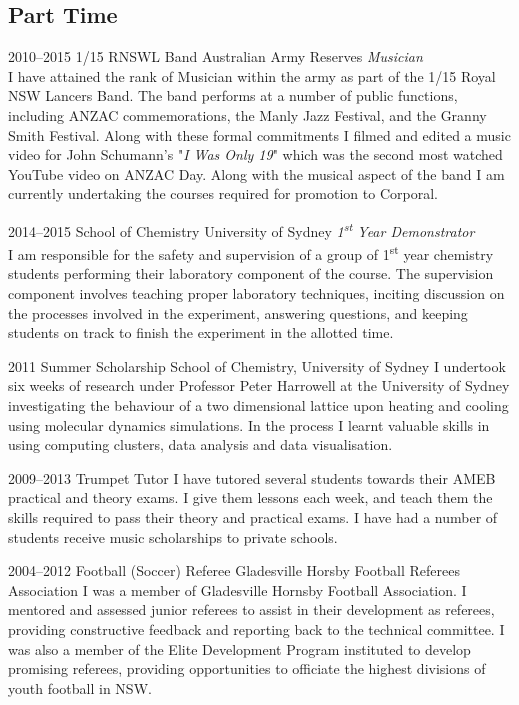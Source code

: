 \documentclass{friggeri-cv} %
\begin{document}
\subsection{Part Time}

\begin{entrylist}

\entry
{2010--2015}
{1/15 RNSWL Band}
{Australian Army Reserves}
{\emph{Musician} \\
I have attained the rank of Musician within the army as part of the 1/15 Royal NSW Lancers Band. The band performs at a number of public functions, including ANZAC commemorations, the Manly Jazz Festival, and the Granny Smith Festival. Along with these formal commitments I filmed and edited a music video for John Schumann's "\emph{I Was Only 19}" which was the second most watched YouTube video on ANZAC Day. Along with the musical aspect of the band I am currently undertaking the courses required for promotion to Corporal.}


\entry
{2014--2015}
{School of Chemistry}
{University of Sydney}
{\emph{1\textsuperscript{st} Year Demonstrator} \\
    I am responsible for the safety and supervision of a group of 1\textsuperscript{st} year chemistry students performing their laboratory component of the course. The supervision component involves teaching proper laboratory techniques, inciting discussion on the processes involved in the experiment, answering questions, and keeping students on track to finish the experiment in the allotted time.}


\entry
{2011}
{Summer Scholarship}
{School of Chemistry, University of Sydney}
{I undertook six weeks of research under Professor Peter Harrowell at the University of Sydney investigating the behaviour of a two dimensional lattice upon heating and cooling using molecular dynamics simulations. In the process I learnt valuable skills in using computing clusters, data analysis and data visualisation.}


\entry
{2009--2013}
{Trumpet Tutor}
{}
{I have tutored several students towards their AMEB practical and theory exams. I give them lessons each week, and teach them the skills required to pass their theory and practical exams. I have had a number of students receive music scholarships to private schools.}

\entry
{2004--2012}
{Football (Soccer) Referee}
{Gladesville Horsby Football Referees Association}
{I was a member of Gladesville Hornsby Football Association. I mentored and assessed junior referees to assist in their development as referees, providing constructive feedback and reporting back to the technical committee. I was also a member of the Elite Development Program instituted to develop promising referees, providing opportunities to officiate the highest divisions of youth football in NSW.}

\end{entrylist}
\end{document}
